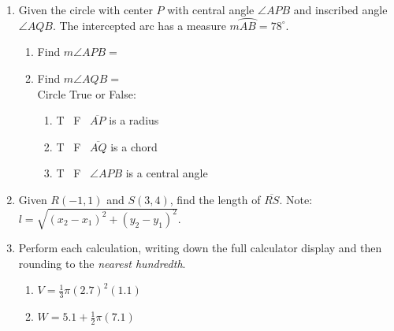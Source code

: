 \documentclass[12pt, twoside]{article}
\begin{document}
\begin{enumerate}
    \item Given the circle with center $P$ with central angle $\angle APB$ and inscribed angle $\angle AQB$. The intercepted arc has a measure $m \wideparen{AB}=78^\circ$.
  \begin{multicols}{2}
    \raggedcolumns
    \begin{enumerate}
      \item Find $m\angle APB=$ \vspace{0.7cm}
      \item Find $m\angle AQB=$ \vspace{0.7cm}\\
      Circle True or False:
      \begin{enumerate}[itemsep=0.3cm]
        \item T \, F \, $\overline{AP}$ is a radius
        \item T \, F \, $\overline{AQ}$ is a chord
        \item T \, F \, $\angle APB$ is a central angle
      \end{enumerate}
    \end{enumerate}
  \end{multicols} \vspace{0.25cm}

  \item Given $R(-1,1)$ and $S(3,4)$, find the length of $\overline{RS}$. Note: $l=\sqrt{(x_2-x_1)^2+(y_2-y_1)^2}$. %
  
\newpage
  \item Perform each calculation, writing down the full calculator display and then rounding to the \emph{nearest hundredth}.
  \begin{multicols}{2}
  \begin{enumerate}
    \item $V=\frac{1}{3} \pi (2.7)^2(1.1)$
    \item $W=5.1 + \frac{1}{2} \pi (7.1)$  
  \end{enumerate}
  \end{multicols}\vspace{2cm}


\end{enumerate}
\end{document}
